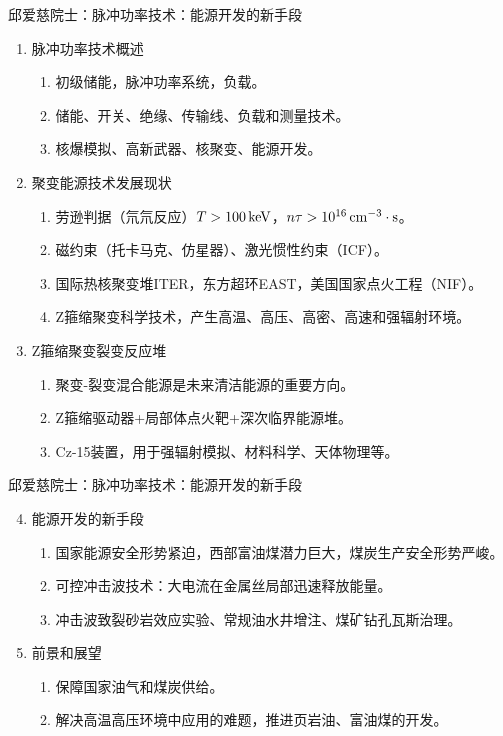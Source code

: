 \documentclass{ctexbeamer}
\begin{document}
\begin{frame}{邱爱慈院士：脉冲功率技术：能源开发的新手段}
    \begin{enumerate}
        \item 脉冲功率技术概述
        \begin{enumerate}
            \item 初级储能，脉冲功率系统，负载。
            \item 储能、开关、绝缘、传输线、负载和测量技术。
            \item 核爆模拟、高新武器、核聚变、能源开发。
        \end{enumerate}
        \item 聚变能源技术发展现状
        \begin{enumerate}
            \item 劳逊判据（氘氘反应）$T>100 {\,\rm keV}$，$n\tau > 10^{16}{\,\rm {cm}^{-3}\cdot s}$。
            \item 磁约束（托卡马克、仿星器）、激光惯性约束（ICF）。
            \item 国际热核聚变堆ITER，东方超环EAST，美国国家点火工程（NIF）。
            \item Z箍缩聚变科学技术，产生高温、高压、高密、高速和强辐射环境。
        \end{enumerate}
        \item Z箍缩聚变裂变反应堆
        \begin{enumerate}
            \item 聚变-裂变混合能源是未来清洁能源的重要方向。
            \item Z箍缩驱动器+局部体点火靶+深次临界能源堆。
            \item Cz-15装置，用于强辐射模拟、材料科学、天体物理等。
        \end{enumerate}
    \end{enumerate}
\end{frame}

\begin{frame}{邱爱慈院士：脉冲功率技术：能源开发的新手段}
    \begin{enumerate}\setcounter{enumi}{3}
        \item 能源开发的新手段
        \begin{enumerate}
            \item 国家能源安全形势紧迫，西部富油煤潜力巨大，煤炭生产安全形势严峻。
            \item 可控冲击波技术：大电流在金属丝局部迅速释放能量。
            \item 冲击波致裂砂岩效应实验、常规油水井增注、煤矿钻孔瓦斯治理。
        \end{enumerate}
        \item 前景和展望
        \begin{enumerate}
            \item 保障国家油气和煤炭供给。
            \item 解决高温高压环境中应用的难题，推进页岩油、富油煤的开发。
        \end{enumerate}
    \end{enumerate}
\end{frame}
\end{document}
